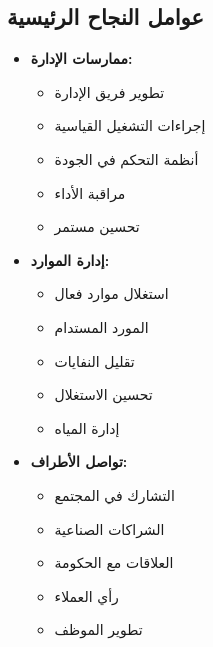 \subsection{عوامل النجاح الرئيسية}
\begin{itemize}
    \item \textbf{ممارسات الإدارة:}
    \begin{itemize}
        \item تطوير فريق الإدارة
        \item إجراءات التشغيل القياسية
        \item أنظمة التحكم في الجودة
        \item مراقبة الأداء
        \item تحسين مستمر
    \end{itemize}
    
    \item \textbf{إدارة الموارد:}
    \begin{itemize}
        \item استغلال موارد فعال
        \item المورد المستدام
        \item تقليل النفايات
        \item تحسين الاستغلال
        \item إدارة المياه
    \end{itemize}
    
    \item \textbf{تواصل الأطراف:}
    \begin{itemize}
        \item التشارك في المجتمع
        \item الشراكات الصناعية
        \item العلاقات مع الحكومة
        \item رأي العملاء
        \item تطوير الموظف
    \end{itemize}
\end{itemize}

